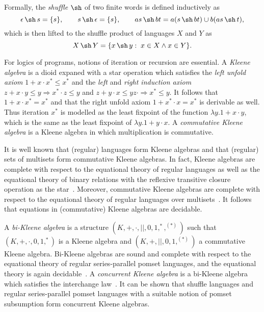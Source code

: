 \documentclass{llncs}
\DeclareMathOperator{\sha}{\sh}
\begin{document}
Formally, the \emph{shuffle} $\sha$ of two finite words is defined
inductively as
\begin{equation*}
\epsilon \sha s = \{s\}, \qquad s \sha \epsilon = \{s\},\qquad
as \sha bt = a(s \sha bt) \cup b(as \sha t),
\end{equation*}
which is then lifted to the shuffle product of languages $X$ and $Y$
as
\begin{equation*}
X \sha Y = \{x \sha y:\; x \in X \land x \in Y\}.
\end{equation*}

For logics of programs, notions of iteration or recursion are
essential. A \emph{Kleene algebra} is a dioid expaned with a star
operation which satisfies the \emph{left unfold axiom} $1 + x\cdot
x^*\le x^*$ and the \emph{left} and \emph{right induction axiom} $z+x
\cdot y \le y\Rightarrow x^*\cdot z \le y$ and $z + y\cdot x \le y
z\cdot \Rightarrow x^* \le y$. It follows that $1+x\cdot x^* = x^*$
and that the right unfold axiom $1+x^*\cdot x=x^*$ is derivable as
well. Thus iteration $x^\ast$ is modelled as the least fixpoint of the
function $\lambda y. 1+x\cdot y$, which is the same as the least
fixpoint of $\lambda y.1+ y\cdot x$. A \emph{commutative Kleene
  algebra} is a Kleene algebra in which multiplication is commutative.

It is well known that (regular) languages form Kleene algebras and
that (regular) sets of multisets form commutative Kleene algebras. In
fact, Kleene algebras are complete with respect to the equational
theory of regular languages as well as the equational theory of binary
relations with the reflexive transitive closure operation as the
star~\cite{Kozen}. Moreover, commutative Kleene algebras are
complete with respect to the equational theory of regular languages
over multisets~\cite{Conway}. It follows that equations in
(commutative) Kleene algebras are decidable.

A \emph{bi-Kleene algebra} is a structure
$(K,+,\cdot,||,0,1,^*,^{(*)})$ such that $(K,+,\cdot,0,1,^*)$ is a
Kleene algebra and $(K,+,||,0,1,^{(*)})$ a commutative Kleene
algebra. Bi-Kleene algebras are sound and complete with respect to the
equational theory of regular series-parallel pomset languages, and the
equational theory is again decidable~\cite{LaurenceStruth}. A
\emph{concurrent Kleene algebra} is a bi-Kleene algebra which
satisfies the interchange law~\cite{Hoareetal}. It can be shown that
shuffle languages and regular series-parallel pomset languages with a
suitable notion of pomset subsumption form concurrent Kleene algebras.
\end{document}
